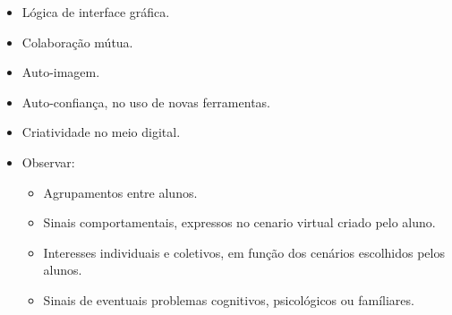 \begin{itemize}
	\item Lógica de interface gráfica.
	\item Colaboração mútua.
	\item Auto-imagem.
	\item Auto-confiança, no uso de novas ferramentas.
	\item Criatividade no meio digital.
	\item Observar:
	\begin{itemize}
		\item Agrupamentos entre alunos.
		\item Sinais comportamentais, expressos no cenario virtual criado pelo aluno.
		\item Interesses individuais e coletivos, em função dos cenários escolhidos pelos alunos.
		\item Sinais de eventuais problemas cognitivos, psicológicos ou famíliares.
	\end{itemize}
\end{itemize}